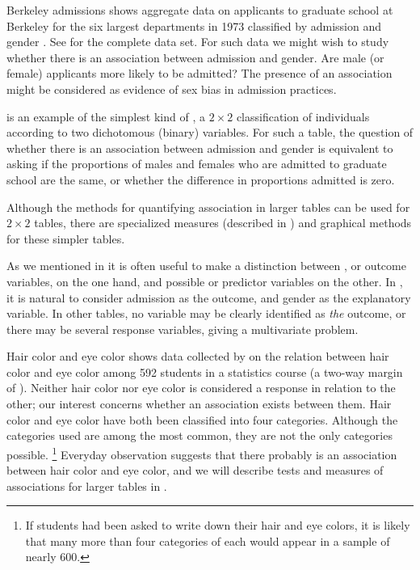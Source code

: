 \documentclass[11pt]{book}
\begin{document}
\begin{Example}[berkeley1]{Berkeley admissions}
 shows aggregate data on applicants to
graduate school at Berkeley for the six largest departments in 1973
classified by admission and gender
\citep{Bickel-etal:75}.
See  for the complete data set.
For such data we might wish to study whether there is an association
between admission and gender.
Are male (or female) applicants more likely to be admitted?
The presence of an association might be considered as
evidence of sex bias in admission practices.

 is an example of the simplest kind of \ctab,
a $2 \times 2$ classification of individuals according to two
dichotomous (binary) variables.
For such a table, the question of whether there is an association
between admission and gender is equivalent to asking if the
proportions of males and females who are admitted to graduate
school are the same, or whether the difference in proportions
admitted is zero.

\end{Example}

Although the methods for quantifying association in larger tables can be
used for $2 \times 2$ tables, there are specialized measures
(described in ) and
graphical methods for these simpler tables.

As we mentioned in 
it is often useful to make a distinction between ,
or outcome variables, on the one hand, 
and possible 
or predictor variables on the other.
In , it is natural to consider admission
as the outcome, and gender as the explanatory variable.
In other tables, no variable may be clearly identified as \emph{the}
outcome, or there may be several response variables, giving a
multivariate problem.

\begin{Example}[haireye1]{Hair color and eye color}
 shows data collected by
\citet{Snee:74}
on the relation between hair color and eye color among 592
students in a statistics course
(a two-way margin of ).  Neither hair color nor eye color
is considered a response in relation to the other;  our interest concerns
whether an association exists between them.
Hair color and eye color have both been classified
into four categories.  Although the categories used are among the most
common, they are not the only categories possible.%
\footnote{If students had been asked to write down their hair and eye
colors, it is likely that many more than four categories of each
would appear in a sample of nearly 600.}
Everyday observation suggests that there probably is an association
between hair color and eye color, and we will describe tests
and measures of associations for larger tables in
.

\end{Example}
\end{document}
